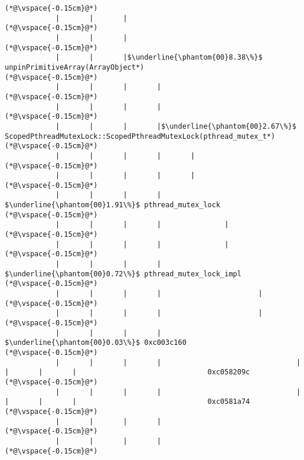 \begin{lstlisting}[caption=Unicode-merkkijonon osoitinoperaatio, label=profile:C2JReadUnicode-512, numberbychapter=true, frame=lines, float, floatplacement=t]
(*@\vspace{-0.15cm}@*)
            |       |       |
(*@\vspace{-0.15cm}@*)
            |       |       |
(*@\vspace{-0.15cm}@*)
            |       |       |$\underline{\phantom{00}8.38\%}$ unpinPrimitiveArray(ArrayObject*)
(*@\vspace{-0.15cm}@*)
            |       |       |       |
(*@\vspace{-0.15cm}@*)
            |       |       |       |
(*@\vspace{-0.15cm}@*)
            |       |       |       |$\underline{\phantom{00}2.67\%}$ ScopedPthreadMutexLock::ScopedPthreadMutexLock(pthread_mutex_t*)
(*@\vspace{-0.15cm}@*)
            |       |       |       |       |
(*@\vspace{-0.15cm}@*)
            |       |       |       |       |
(*@\vspace{-0.15cm}@*)
            |       |       |       |        $\underline{\phantom{00}1.91\%}$ pthread_mutex_lock
(*@\vspace{-0.15cm}@*)
            |       |       |       |               |
(*@\vspace{-0.15cm}@*)
            |       |       |       |               |
(*@\vspace{-0.15cm}@*)
            |       |       |       |                $\underline{\phantom{00}0.72\%}$ pthread_mutex_lock_impl
(*@\vspace{-0.15cm}@*)
            |       |       |       |                       |
(*@\vspace{-0.15cm}@*)
            |       |       |       |                       |
(*@\vspace{-0.15cm}@*)
            |       |       |       |                        $\underline{\phantom{00}0.03\%}$ 0xc003c160
(*@\vspace{-0.15cm}@*)
            |       |       |       |                                |       |       |       |                               0xc058209c
(*@\vspace{-0.15cm}@*)
            |       |       |       |                                |       |       |       |                               0xc0581a74
(*@\vspace{-0.15cm}@*)
            |       |       |       |
(*@\vspace{-0.15cm}@*)
            |       |       |       |
(*@\vspace{-0.15cm}@*)

\end{lstlisting}
